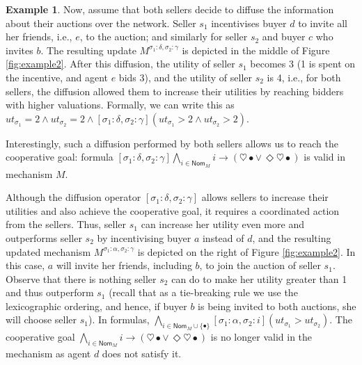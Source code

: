\documentclass[letterpaper]{article} %
\theoremstyle{definition}
\newtheorem{example}{Example}
\begin{document}
\begin{example}
Now, assume that both sellers decide to diffuse the information about their auctions over the network. Seller $s_1$ incentivises buyer $d$ to invite all her friends, i.e., $e$, to the auction; and similarly for seller $s_2$ and buyer $c$ who invites $b$. The resulting update $M^{\sigma_1:\delta, \sigma_2: \gamma}$ is depicted in the middle of Figure \ref{fig:example2}. After this diffusion, the utility of seller $s_1$ becomes 3 (1 is spent on the incentive, and agent $e$ bids 3), and the utility of seller $s_2$ is 4, i.e., for both sellers, the diffusion allowed them to increase their utilities by reaching bidders with higher valuations. Formally, we can write this as $ut_{\sigma_1} = 2 \land ut_{\sigma_2} = 2 \land [\sigma_1:\delta, \sigma_2:\gamma] (ut_{\sigma_1} > 2 \land ut_{\sigma_2} > 2)$.

Interestingly, such a diffusion performed by both sellers allows us to reach the cooperative goal: formula $[\sigma_1:\delta, \sigma_2:\gamma]\bigwedge_{i \in \mathsf{Nom}_M} i \to (\heartsuit \bullet \lor \,\Diamond \heartsuit \bullet)$ is valid in mechanism $M$.%

Although the diffusion operator $[\sigma_1:\delta, \sigma_2:\gamma]$ allows sellers to increase their utilities and also achieve the cooperative goal, it requires a coordinated action from the sellers. Thus, seller $s_1$ can increase her utility even more and outperforms seller $s_2$ by incentivising buyer $a$ instead of $d$, and the resulting updated mechanism $M^{\sigma_1:\alpha, \sigma_2: \gamma}$ is depicted on the right of Figure \ref{fig:example2}. In this case, $a$ will invite her friends, including $b$, to join the auction of seller $s_1$. Observe that %
there is nothing seller $s_2$ can do to make her utility greater than 1 and thus outperform $s_1$ (recall that as a tie-breaking rule we use the lexicographic ordering, and hence, if buyer $b$ is being invited to both auctions, she will choose seller $s_1$). 
In formulas, $\bigwedge_{i \in \mathsf{Nom}_M \cup \{\bullet\}}[\sigma_1 : \alpha, \sigma_2: i] (ut_{\sigma_1} > ut_{\sigma_2})$. The cooperative goal $\bigwedge_{i \in \mathsf{Nom}_M} i \to (\heartsuit \bullet \lor \, \Diamond \heartsuit \bullet)$ is no longer valid in the mechanism as agent $d$ does not satisfy it. 



\end{example}
\end{document}
